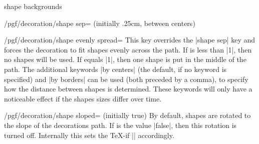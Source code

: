 \begin{decoration}{shape backgrounds}
\begin{key}{/pgf/decoration/shape sep= (initially {.25cm, between centers})}
\begin{codeexample}[]
\end{codeexample}
  \end{key}

  \begin{key}{/pgf/decoration/shape evenly spread=}
    This key overrides the |shape sep| key and forces the decoration to
    fit  shapes evenly across the path.
    If  is less than |1|, then no shapes will be used.
    If  equals |1|, then one shape is put in the middle
    of the path.
    The additional keywords |by centers| (the default, if no keyword is
    specified) and |by borders| can be used (both preceded by a comma),
    to specify how the distance between shapes is determined. These
    keywords will only have a noticeable effect if the shapes sizes
    differ over time.

\begin{codeexample}[]
\end{codeexample}
  \end{key}

  \begin{key}{/pgf/decoration/shape sloped= (initially true)}
    By default, shapes are rotated to the slope of the decorations path. If
     is the value |false|, then this rotation is turned
    off. Internally this sets the \TeX-if |\ifpgfshapedecorationsloped|
    accordingly.


\end{key}
\end{decoration}
